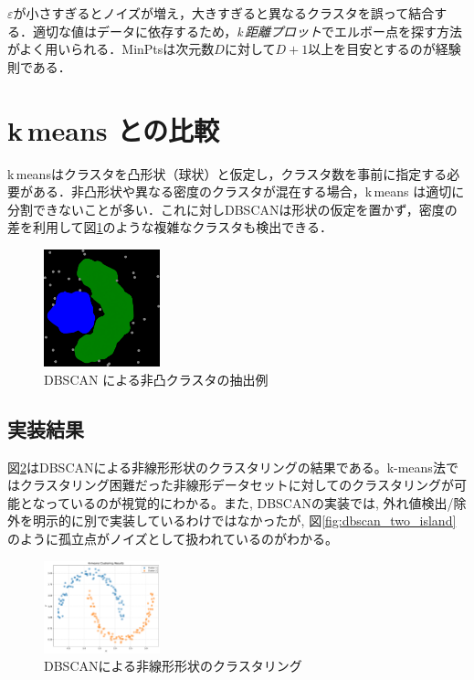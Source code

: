 \documentclass[a4j]{jsarticle}
\begin{document}
$\varepsilon$が小さすぎるとノイズが増え，大きすぎると異なるクラスタを誤って結合する．適切な値はデータに依存するため，\emph{k\,\-距離プロット}でエルボー点を探す方法がよく用いられる．MinPtsは次元数$D$に対して$D+1$以上を目安とするのが経験則である．

\clearpage
\section{k\,\-means との比較}

k\,\-meansはクラスタを凸形状（球状）と仮定し，クラスタ数を事前に指定する必要がある．非凸形状や異なる密度のクラスタが混在する場合，k\,\-means は適切に分割できないことが多い．これに対しDBSCANは形状の仮定を置かず，密度の差を利用して図\ref{fig:dbscan}のような複雑なクラスタも検出できる．

\begin{figure}[htbp]
  \centering
  \includegraphics[width=0.3\textwidth]{31d42bec-0995-4e7d-9d96-cb806a43999e.png}
  \caption{DBSCAN による非凸クラスタの抽出例}
  \label{fig:dbscan}
\end{figure}

\clearpage
\subsection{実装結果}
図\ref{fig:dbscan_moon}はDBSCANによる非線形形状のクラスタリングの結果である。k-means法ではクラスタリング困難だった非線形データセットに対してのクラスタリングが可能となっているのが視覚的にわかる。また, DBSCANの実装では, 外れ値検出/除外を明示的に別で実装しているわけではなかったが, 図\ref{fig:dbscan_two_island}のように孤立点がノイズとして扱われているのがわかる。

\begin{figure}[htbp]
  \centering
  \includegraphics[width=0.3\textwidth]{moon_output_plot.pdf}
  \caption{DBSCANによる非線形形状のクラスタリング}
  \label{fig:dbscan_moon}
\end{figure}
\end{document}
